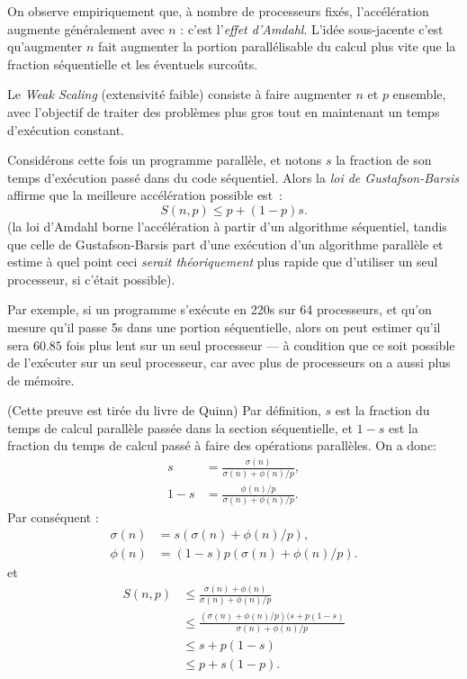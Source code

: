 On observe empiriquement que, à nombre de processeurs fixés, l'accélération
augmente généralement avec $n$ : c'est l'\emph{effet d'Amdahl}. L'idée
sous-jacente c'est qu'augmenter $n$ fait augmenter la portion parallélisable du
calcul plus vite que la fraction séquentielle et les éventuels surcoûts.

Le \textit{Weak Scaling} (\og extensivité faible\fg) consiste à faire augmenter
$n$ et $p$ ensemble, avec l'objectif de traiter des problèmes plus gros tout en
maintenant un temps d'exécution constant.

Considérons cette fois un programme parallèle, et notons $s$ la fraction de son
temps d'exécution passé dans du code séquentiel. Alors la \emph{loi de
  Gustafson-Barsis} affirme que la meilleure accélération possible est~:
\[
  S(n, p) \leq p + (1-p)s.
\]
(la loi d'Amdahl borne l'accélération à partir d'un algorithme séquentiel,
tandis que celle de Gustafson-Barsis part d'une exécution d'un algorithme
parallèle et estime à quel point ceci \emph{serait théoriquement} plus rapide
que d'utiliser un seul processeur, si c'était possible).

Par exemple, si un programme s'exécute en 220s sur 64 processeurs, et qu'on
mesure qu'il passe 5s dans une portion séquentielle, alors on peut estimer qu'il
sera $60.85$ fois plus lent sur un seul processeur --- à condition que ce soit
possible de l'exécuter sur un seul processeur, car avec plus de processeurs on a
aussi plus de mémoire.

\begin{myproof}
  (Cette preuve est tirée du livre de Quinn) Par définition, $s$ est la fraction
  du temps de calcul parallèle passée dans la section séquentielle, et $1-s$ est
  la fraction du temps de calcul passé à faire des opérations parallèles. On a
  donc:
  \begin{align*}
    s & = \frac{\sigma(n)}{\sigma(n) + \phi(n) / p}, \\
   1- s & = \frac{\phi(n) / p}{\sigma(n) + \phi(n) / p}.
  \end{align*}
  Par conséquent :
  \begin{align*}
    \sigma(n) & = s (\sigma(n) + \phi(n) / p), \\
    \phi(n) & = (1-s) p (\sigma(n) + \phi(n) / p).
  \end{align*}
  et
  \begin{align*}
    S(n, p) & \leq \frac{\sigma(n) + \phi(n)}{\sigma(n) + \phi(n) / p} \\
             & \leq \frac{(\sigma(n) + \phi(n) / p)(s + p(1-s)}{\sigma(n) + \phi(n) / p} \\
             & \leq s + p(1-s)\\
             & \leq p + s(1-p).
  \end{align*}
\end{myproof}

